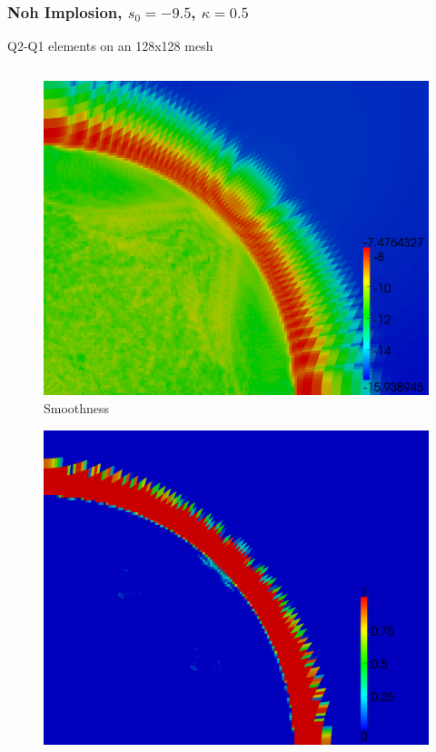 \documentclass[8pt,xcolor=svgnames]{beamer}
\begin{document}
\begin{frame}\frametitle{Noh Implosion, $s_0=-9.5$, $\kappa=0.5$}
\vspace{1ex}
Q2-Q1 elements on an 128x128 mesh
\vspace{-4ex}
\begin{columns}
\begin{column}{0.3\textwidth}
\begin{figure}[t]
\begin{center}
\includegraphics[height=0.9\textwidth]{figs/Noh/Q2l-7-smoothness.png}
\\Smoothness
\end{center}
\end{figure}
\begin{figure}[t]
\begin{center}
\includegraphics[height=0.9\textwidth]{figs/Noh/Q2l-7-limiter.png}

\end{center}
\end{figure}
\end{column}
\end{columns}
\end{frame}
\end{document}
